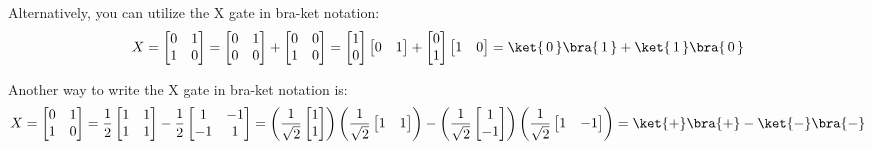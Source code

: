\documentclass{article}
\theoremstyle{definition}
\newcommand{\kz}[1]{\ket{\,#1\,}}
\newcommand{\kx}[1]{\ket{#1}}
\newcommand{\bz}[1]{\bra{\,#1\,}}
\newcommand{\bx}[1]{\bra{#1}}
\begin{document}
Alternatively, you can utilize the X gate in bra-ket notation:
\begin{equation}
	X = \begin{bmatrix}
		0 & 1\\
		1 & 0
	\end{bmatrix} = \begin{bmatrix}
		0 & 1\\
		0 & 0
	\end{bmatrix} + \begin{bmatrix}
		0 & 0\\
		1 & 0
	\end{bmatrix} = \begin{bmatrix}
		1\\
		0
	\end{bmatrix} \begin{bmatrix}
		0 & 1
	\end{bmatrix} + \begin{bmatrix}
		0\\
		1
	\end{bmatrix} \begin{bmatrix}
		1 & 0
	\end{bmatrix} = \kz{0}\bz{1} + \kz{1}\bz{0}
\end{equation}

Another way to write the X gate in bra-ket notation is:
\begin{equation}
	X = \begin{bmatrix}
		0 & 1\\
		1 & 0
	\end{bmatrix} = \frac{1}{2}\begin{bmatrix}
		1 & 1\\
		1 & 1
	\end{bmatrix} - \frac{1}{2}\begin{bmatrix}
		1 & -1\\
		-1 & 1
	\end{bmatrix} = \left(\frac{1}{\sqrt{2}}\begin{bmatrix}
		1\\
		1
	\end{bmatrix}\right) \left(\frac{1}{\sqrt{2}}\begin{bmatrix}
		1 & 1
	\end{bmatrix}\right) - \left(\frac{1}{\sqrt{2}}\begin{bmatrix}
		1\\
		-1
	\end{bmatrix}\right) \left(\frac{1}{\sqrt{2}}\begin{bmatrix}
		1 & -1
	\end{bmatrix}\right) = \kx{+}\bx{+} - \kx{-}\bx{-}
\end{equation}
\end{document}
